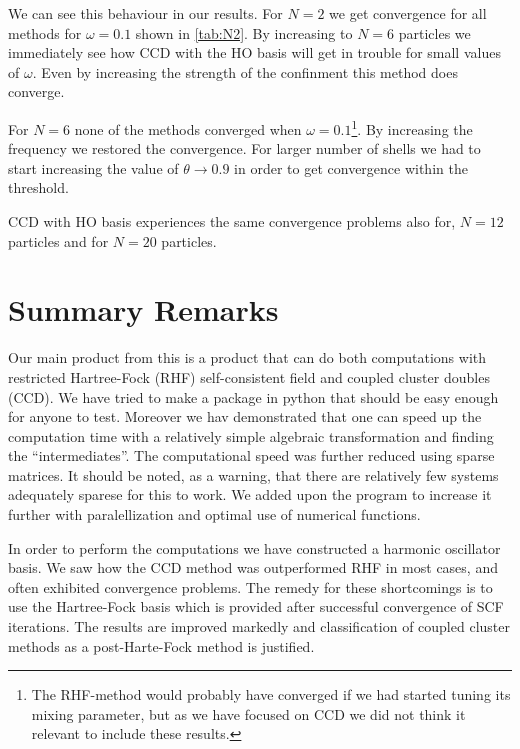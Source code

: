 \documentclass[
    a4paper, aps, twocolumn, floatfix, superscriptaddress,
    nofootinbib]{revtex4-1}
\newcommand{\1}{\mathds{1}}
\begin{document}
        We can see this behaviour in our results. For $N = 2$ we get convergence
        for all methods for $\omega = 0.1$ shown in \autoref{tab:N2}. By
        increasing to $N = 6$ particles we immediately see how CCD with the HO
        basis will get in trouble for small values of $\omega$. Even by increasing
        the strength of the confinment this method does converge.

        For $N = 6$ none of the methods converged when $\omega =
        0.1$\footnote{The RHF-method would probably have converged if we had
        started tuning its mixing parameter, but as we have focused on CCD we did
        not think it relevant to include these results.}. By increasing the
        frequency we restored the convergence. For larger number of shells we
        had to start increasing the value of $\theta \to 0.9$ in order to get
        convergence within the threshold.

        CCD with HO basis experiences the same convergence problems also for,
        $N=12$ particles and for $N=20$ particles.


    \section{Summary Remarks}

        Our main product from this is a product that can do both computations with
        restricted Hartree-Fock (RHF) self-consistent field and coupled cluster
        doubles (CCD). We have tried
        to make a package in python that should be easy enough for anyone to test.
        Moreover we hav demonstrated that one can speed up the computation time with
        a relatively simple algebraic transformation and finding the ``intermediates''.
        The computational speed was further reduced using sparse matrices. It should
        be noted, as a warning, that there are relatively few systems adequately sparese
        for this to work. We added upon the program to increase it further with
        paralellization and optimal use of numerical functions.

        In order to perform the computations we have constructed a harmonic oscillator
        basis. We saw how the CCD method was outperformed RHF in most cases, and often
        exhibited convergence problems. The remedy for these shortcomings is to use
        the Hartree-Fock basis which is provided after successful convergence of
        SCF iterations. The results are improved markedly and classification of coupled
        cluster methods as a post-Harte-Fock method is justified.
\end{document}
